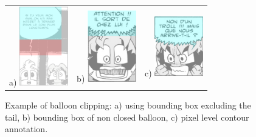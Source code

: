 \begin{figure}[h!]
\begin{center}
\begin{tabular}{ccc}
a) \includegraphics[width=80px]{segBalloon1.png} 
& 
b) \includegraphics[width=80px]{segBalloon2.png}
&
c) \includegraphics[width=80px]{segBalloon3.png}
\end{tabular}
\caption[Speech balloon contour annotation]{Example of balloon clipping: a) using bounding box excluding the tail, b) bounding box of non closed balloon, c) pixel level contour annotation.} 
\label{fig:gt:segBalloons}
\end{center}
\end{figure}


